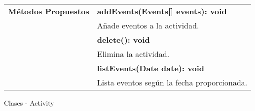 \begin{clases}
\begin{tabular}{|>{\raggedright\arraybackslash}p{4cm}|p{12cm}|}
		\hline
		\textbf{Métodos Propuestos}   & \textbf{addEvents(Events[] events): void}                                                                                                                                                                                                 \\
		                              & Añade eventos a la actividad.                                                                                                                                                                                                             \\
		                              & \textbf{delete(): void}                                                                                                                                                                                                                   \\
		                              & Elimina la actividad.                                                                                                                                                                                                                     \\
		                              & \textbf{listEvents(Date date): void}                                                                                                                                                                                                      \\
		                              & Lista eventos según la fecha proporcionada.                                                                                                                                                                                               \\
		\hline
	\end{tabular}
	\caption{Clases - Activity}
\end{clases}

